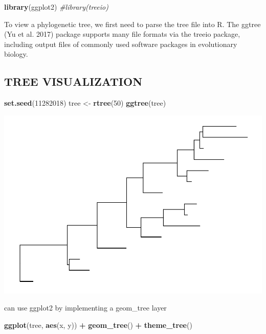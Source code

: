 \documentclass[]{article}
\newenvironment{Shaded}{\begin{snugshade}}{\end{snugshade}}
\newcommand{\KeywordTok}[1]{\textcolor[rgb]{0.13,0.29,0.53}{\textbf{#1}}}
\newcommand{\DecValTok}[1]{\textcolor[rgb]{0.00,0.00,0.81}{#1}}
\newcommand{\StringTok}[1]{\textcolor[rgb]{0.31,0.60,0.02}{#1}}
\newcommand{\CommentTok}[1]{\textcolor[rgb]{0.56,0.35,0.01}{\textit{#1}}}
\newcommand{\OperatorTok}[1]{\textcolor[rgb]{0.81,0.36,0.00}{\textbf{#1}}}
\newcommand{\NormalTok}[1]{#1}
\begin{document}
\begin{Shaded}
\begin{Highlighting}[]
\KeywordTok{library}\NormalTok{(ggplot2)}
\CommentTok{#library(treeio)}
\end{Highlighting}
\end{Shaded}

To view a phylogenetic tree, we first need to parse the tree file into
R. The ggtree (Yu et al. 2017) package supports many file formats via
the treeio package, including output files of commonly used software
packages in evolutionary biology.

\subsection{TREE VISUALIZATION}\label{tree-visualization}

\begin{Shaded}
\begin{Highlighting}[]
\KeywordTok{set.seed}\NormalTok{(}\DecValTok{11282018}\NormalTok{)}
\NormalTok{tree <-}\StringTok{ }\KeywordTok{rtree}\NormalTok{(}\DecValTok{50}\NormalTok{)}
\KeywordTok{ggtree}\NormalTok{(tree)}
\end{Highlighting}
\end{Shaded}

\includegraphics{ggtree_files/figure-latex/unnamed-chunk-2-1.pdf}

can use ggplot2 by implementing a geom\_tree layer

\begin{Shaded}
\begin{Highlighting}[]
\KeywordTok{ggplot}\NormalTok{(tree, }\KeywordTok{aes}\NormalTok{(x, y)) }\OperatorTok{+}\StringTok{ }\KeywordTok{geom_tree}\NormalTok{() }\OperatorTok{+}\StringTok{ }\KeywordTok{theme_tree}\NormalTok{()}
\end{Highlighting}
\end{Shaded}
\end{document}
